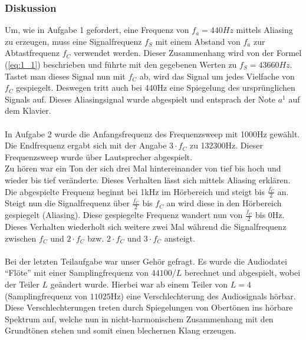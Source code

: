 \clearpage

\subsubsection{Diskussion}
Um, wie in Aufgabe 1 gefordert, eine Frequenz von $f_a = 440Hz$ mittels Aliasing zu erzeugen, muss eine Signalfrequenz $f_S$ mit einem Abstand von $f_a$ zur Abtastfrequenz $f_C$ verwendet werden. Dieser Zusammenhang wird von der Formel (\ref{eq:1_1}) beschrieben und führte mit den gegebenen Werten zu $f_S = 43660Hz$. Tastet man dieses Signal nun mit $f_C$ ab, wird das Signal um jedes Vielfache von $f_C$ gespiegelt. Deswegen tritt auch bei 440Hz eine Spiegelung des ursprünglichen Signals auf. Dieses Aliasingsignal wurde abgespielt und entsprach der Note $a^1$ auf dem Klavier.\\
\\
In Aufgabe 2 wurde die Anfangsfrequenz des Frequenzsweep mit 1000Hz gewählt. Die Endfrequenz ergabt sich mit der Angabe $3 \cdot f_C$ zu 132300Hz. Dieser Frequenzsweep wurde über Lautsprecher abgespielt.\\
Zu hören war ein Ton der sich drei Mal hintereinander von tief bis hoch und wieder bis tief veränderte. Dieses Verhalten lässt sich mittels Aliasing erklären. Die abgespielte Frequenz beginnt bei 1kHz im Hörbereich und steigt bis $\frac{f_C}{2}$ an. Steigt nun die Signalfrequenz über $\frac{f_C}{2}$ bis $f_C$ an wird diese in den Hörbereich gespiegelt (Aliasing). Diese gespiegelte Frequenz wandert nun von $\frac{f_C}{2}$ bis 0Hz. Dieses Verhalten wiederholt sich weitere zwei Mal während die Signalfrequenz zwischen $f_C$ und $2 \cdot f_C$ bzw. $2 \cdot f_C$ und $3 \cdot f_C$ ansteigt.\\
\\
Bei der letzten Teilaufgabe war unser Gehör gefragt. Es wurde die Audiodatei ``Flöte'' mit einer Samplingfrequenz von $44100/L$ berechnet und abgespielt, wobei der Teiler $L$ geändert wurde. Hierbei war ab einem Teiler von $L = 4$ (Samplingfrequenz von $11025$Hz) eine Verschlechterung des Audiosignals hörbar. Diese Verschlechterungen treten durch Spiegelungen von Obertönen ins hörbare Spektrum auf, welche nun in nicht-harmonischem Zusammenhang mit den Grundtönen stehen und somit einen blechernen Klang erzeugen. 
\pagebreak

%
%


